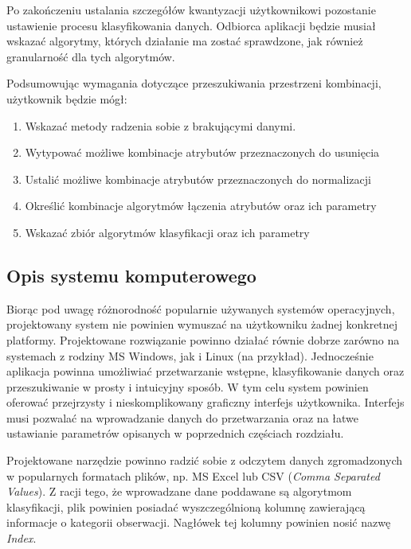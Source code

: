 \documentclass[../thesis.tex]{subfiles}
\begin{document}
Po zakończeniu ustalania szczegółów kwantyzacji użytkownikowi pozostanie ustawienie procesu klasyfikowania danych. Odbiorca aplikacji będzie musiał wskazać algorytmy, których działanie ma zostać sprawdzone, jak również granularność dla tych algorytmów.

Podsumowując wymagania dotyczące przeszukiwania przestrzeni kombinacji, użytkownik będzie mógł:
\begin{enumerate}
\item Wskazać metody radzenia sobie z brakującymi danymi.
\item Wytypować możliwe kombinacje atrybutów przeznaczonych do usunięcia
\item Ustalić możliwe kombinacje atrybutów przeznaczonych do normalizacji
\item Określić kombinacje algorytmów łączenia atrybutów oraz ich parametry
\item Wskazać zbiór algorytmów klasyfikacji oraz ich parametry
\end{enumerate}

\subsection{Opis systemu komputerowego}

Biorąc pod uwagę różnorodność popularnie używanych systemów operacyjnych, projektowany system nie powinien wymuszać na użytkowniku żadnej konkretnej platformy. Projektowane rozwiązanie powinno działać równie dobrze zarówno na systemach z rodziny MS Windows, jak i Linux (na przykład). Jednocześnie aplikacja powinna umożliwiać przetwarzanie wstępne, klasyfikowanie danych oraz przeszukiwanie w prosty i intuicyjny sposób. W tym celu system powinien oferować przejrzysty i nieskomplikowany graficzny interfejs użytkownika. Interfejs musi pozwalać na wprowadzanie danych do przetwarzania oraz na łatwe ustawianie parametrów opisanych w poprzednich częściach rozdziału.

Projektowane narzędzie powinno radzić sobie z odczytem danych zgromadzonych w popularnych formatach plików, np. MS Excel lub CSV (\textit{Comma Separated Values}). Z racji tego, że wprowadzane dane poddawane są algorytmom klasyfikacji, plik powinien posiadać wyszczególnioną kolumnę zawierającą informacje o kategorii obserwacji. Nagłówek tej kolumny powinien nosić nazwę \textit{Index}.
\end{document}

